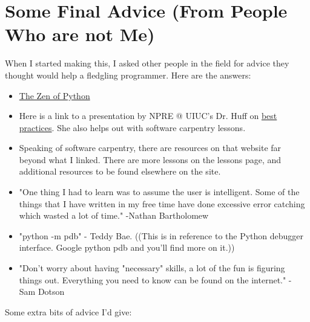 \documentclass[letterpaper]{article}
\begin{document}
\section{Some Final Advice (From People Who are not Me)}

When I started making this, I asked other people in the field for advice they thought would help a fledgling programmer.  Here are the answers:

\begin{itemize}

\item \href{https://www.python.org/dev/peps/pep-0020/}{The Zen of Python}
\item Here is a link to a presentation by NPRE @ UIUC's Dr. Huff on \href{https://katyhuff.github.io/2018-12-22-mumbai/#/}{best practices}.  She also helps out with software carpentry lessons.
\item Speaking of software carpentry, there are resources on that website far beyond what I linked.  There are more lessons on the lessons page, and additional resources to be found elsewhere on the site.
\item "One thing I had to learn was to assume the user is intelligent. Some of the things that I have written in my free time have done excessive error catching which wasted a lot of time." -Nathan Bartholomew
\item "python -m pdb" - Teddy Bae.  ((This is in reference to the Python debugger interface.  Google python pdb and you'll find more on it.))
\item "Don't worry about having "necessary" skills, a lot of the fun is figuring things out. Everything you need to know can be found on the internet." - Sam Dotson
\end{itemize}

Some extra bits of advice I'd give:
\end{document}
